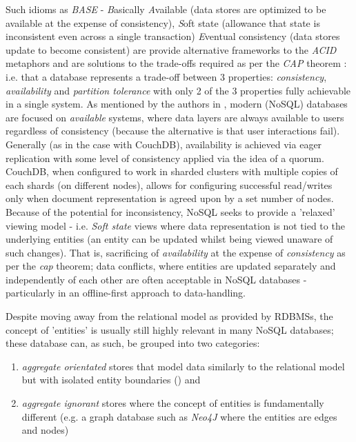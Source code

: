 Such idioms as \textit{BASE} - \textit{B}asically \textit{A}vailable (data stores are optimized to be available at the expense of consistency), \textit{S}oft state (allowance that state is inconsistent even across a single transaction) \textit{E}ventual consistency (data stores update to become consistent) are provide alternative frameworks to the \textit{ACID} metaphors and are solutions to the trade-offs required as per the \textit{CAP} theorem \cite{GANESHCHANDRA201513}: i.e. that a database represents a trade-off between 3 properties: \textit{consistency}, \textit{availability} and \textit{partition tolerance} with only 2 of the 3 properties fully achievable in a single system. As mentioned by the authors in \cite{GANESHCHANDRA201513}, modern (NoSQL) databases are focused on \textit{available} systems, where data layers are always available to users regardless of consistency (because the alternative is that user interactions fail). Generally (as in the case with CouchDB), availability is achieved via eager replication with some level of consistency applied via the idea of a quorum. CouchDB, when configured to work in sharded clusters with multiple copies of each shards (on different nodes), allows for configuring successful read/writes only when document representation is agreed upon by a set number of nodes. Because of the potential for inconsistency, NoSQL seeks to provide a 'relaxed' viewing model - i.e. \textit{Soft state} views where data representation is not tied to the underlying entities (an entity can be updated whilst being viewed unaware of such changes). That is, sacrificing of \textit{availability} at the expense of \textit{consistency} as per the \textit{cap} theorem; data conflicts, where entities are updated separately and independently of each other are often acceptable in NoSQL databases - particularly in an offline-first approach to data-handling.

Despite moving away from the relational model as provided by RDBMSs, the concept of 'entities' is usually still highly relevant in many NoSQL databases; these database can, as such, be grouped into two categories:

\begin{enumerate}
    \item \textit{aggregate orientated} stores that model data similarly to the relational model but with isolated entity boundaries (\cite{fowlerAggregate}) and
    \item \textit{aggregate ignorant} stores where the concept of entities is fundamentally different (e.g. a graph database such as \textit{Neo4J} where the entities are edges and nodes)
\end{enumerate}

